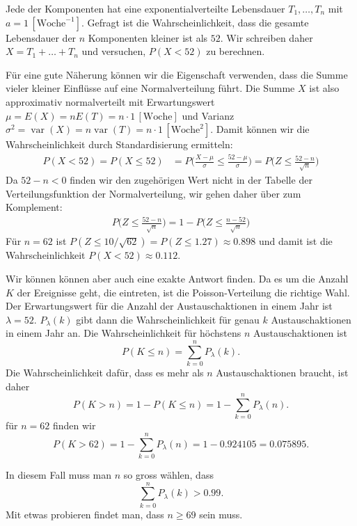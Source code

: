 \begin{loesung}
\begin{teilaufgaben}
\item
Jede der Komponenten hat eine exponentialverteilte Lebensdauer
$T_1,\dots,T_n$ mit $a=1\,[\text{Woche}^{-1}]$.
Gefragt ist die Wahrscheinlichkeit, dass die gesamte Lebensdauer der $n$
Komponenten kleiner ist als $52$.
Wir schreiben daher $X=T_1+\dots+T_n$ und versuchen, $P(X<52)$ zu berechnen.

Für eine gute Näherung können wir die Eigenschaft verwenden, dass die
Summe vieler kleiner Einflüsse auf eine Normalverteilung führt.
Die Summe $X$ ist also approximativ normalverteilt mit Erwartungswert
$\mu=E(X)=n E(T) = n\cdot 1\,[\text{Woche}]$
und Varianz
$\sigma^2=\operatorname{var}(X) = n\operatorname{var}(T)
=
n\cdot 1\,[\text{Woche}^2]$.
Damit können wir die Wahrscheinlichkeit durch Standardisierung ermitteln:
\begin{align*}
P(X< 52)
=
P(X\le 52)
&=
P\biggl(\frac{X-\mu}{\sigma}\le \frac{52-\mu}{\sigma}\biggr)
=
P\biggl(Z\le \frac{52-n}{\sqrt{n}}\biggr)
\end{align*}
Da $52-n<0$ finden wir den zugehörigen Wert nicht in der Tabelle der
Verteilungsfunktion der Normalverteilung, wir gehen daher über zum 
Komplement:
\begin{align*}
P\biggl(Z\le \frac{52-n}{\sqrt{n}}\biggr)
=
1-
P\biggl(Z\le \frac{n-52}{\sqrt{n}}\biggr)
\end{align*}
Für $n=62$ ist $P(Z\le 10/\sqrt{62})=P(Z\le 1.27) \approx 0.898$
und damit ist die Wahrscheinlichkeit $P(X<52)\approx 0.112$.

Wir können können aber auch eine exakte Antwort finden.
Da es um die Anzahl $K$ der Ereignisse geht, die eintreten, ist die
Poisson-Verteilung die richtige Wahl.
Der Erwartungswert für die Anzahl der Austauschaktionen in einem
Jahr ist $\lambda=52$.
$P_\lambda(k)$ gibt dann die Wahrscheinlichkeit für genau $k$
Austauschaktionen in einem Jahr an.
Die Wahrscheinlichkeit für höchstens $n$ Austauschaktionen ist
\[
P(K\le n)
=
\sum_{k=0}^n  P_{\lambda}(k).
\]
Die Wahrscheinlichkeit dafür, dass es mehr als $n$ Austauschaktionen 
braucht, ist daher
\[
P(K>n)
=
1-P(K\le n)
=
1-\sum_{k=0}^n P_{\lambda}(n).
\]
für $n=62$ finden wir
\[
P(K>62)
=
1-\sum_{k=0}^n P_{\lambda}(n)
=
1-0.924105
=
0.075895.
\]
\item
In diesem Fall muss man $n$ so gross wählen, dass
\[
\sum_{k=0}^nP_\lambda(k) >0.99.
\]
Mit etwas probieren findet man, dass $n\ge 69$ sein muss.


\end{teilaufgaben}
\end{loesung}
